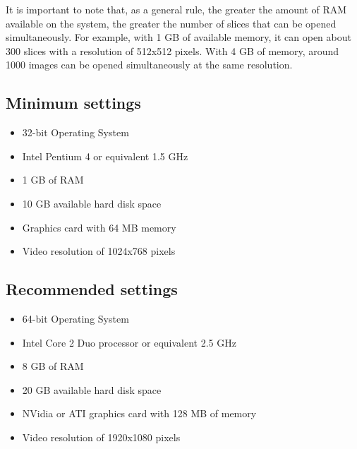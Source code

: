 It is important to note that, as a general rule, the greater the amount of RAM available on the system, the greater the number of slices that can be opened simultaneously. For example, with 1 GB of available memory, it can open about 300 slices with a resolution of 512x512 pixels. With 4 GB of memory, around 1000 images can be opened simultaneously at the same resolution.

\subsection{Minimum settings}

\begin{itemize}
	\item 32-bit Operating System
	\item Intel Pentium 4 or equivalent 1.5 GHz
	\item 1 GB of RAM
	\item 10 GB available hard disk space
	\item Graphics card with 64 MB memory
	\item Video resolution of 1024x768 pixels
\end{itemize}


\subsection{Recommended settings}
\begin{itemize}
	\item 64-bit Operating System
	\item Intel Core 2 Duo processor or equivalent 2.5 GHz
	\item 8 GB of RAM
	\item 20 GB available hard disk space
	\item NVidia or ATI graphics card with 128 MB of memory
	\item Video resolution of 1920x1080 pixels
\end{itemize}


